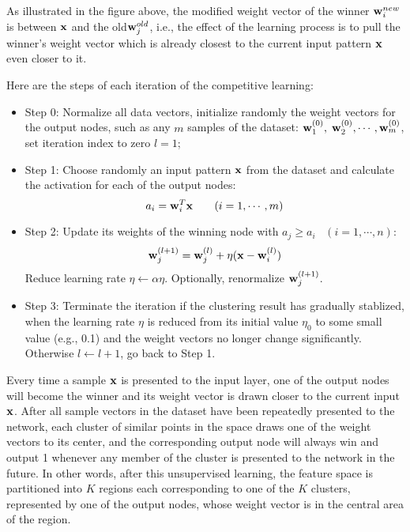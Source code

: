 \documentclass{article}
\begin{document}

As illustrated in the figure above, the modified weight vector of the
winner ${\bf w}_i^{new}$ is between ${\bf x}$ and the old${\bf w}_j^{old}$,
i.e., the effect of the learning process is to pull the winner's weight 
vector which is already closest to the current input pattern ${\bf x}$ 
even closer to it.

Here are the steps of each iteration of the competitive learning:
\begin{itemize}
\item Step 0: Normalize all data vectors, initialize randomly the weight
  vectors for the output nodes, such as any $m$ samples of the dataset:
  ${\bf w}_1^{(0)},\;{\bf w}_2^{(0)},\cdots,{\bf w}_m^{(0)}$, set iteration
  index to zero $l=1$;

\item Step 1: Choose randomly an input pattern ${\bf x}$ from the dataset 
  and calculate the activation for each of the output nodes:
  \begin{equation}
  a_i={\bf w}_i^T{\bf x}\;\;\;\;\;\;\;(i=1,\cdots,m)
  \end{equation}

\item Step 2: Update its weights of the winning node with
  $a_j\ge a_i\;\;\;(i=1,\cdots,n)$:
  \begin{equation}
  {\bf w}_j^{(l+1)}={\bf w}_j^{(l)} +\eta ({\bf x}-{\bf w}_i^{(l)})
  \end{equation}
  Reduce learning rate $\eta\leftarrow \alpha \eta$.
  Optionally, renormalize ${\bf w}_j^{(l+1)}$. 

\item Step 3: Terminate the iteration if the clustering result has
  gradually stablized, when the learning rate $\eta$ is reduced from
  its initial value $\eta_0$ to some small value (e.g., 0.1) and the 
  weight vectors no longer change significantly. Otherwise 
  $l \leftarrow l+1 $, go back to Step 1.
\end{itemize}

Every time a sample ${\bf x}$ is presented to the input layer, one of
the output nodes will become the winner and its weight vector is drawn 
closer to the current input ${\bf x}$. After all sample vectors in the
dataset have been repeatedly presented to the network, each cluster
of similar points in the space draws one of the weight vectors to its 
center, and the corresponding output node will always win and output 1
whenever any member of the cluster is presented to the network in the 
future. In other words, after this unsupervised learning, the feature
space is partitioned into $K$ regions each corresponding to one of the 
$K$ clusters, represented by one of the output nodes, whose weight vector
is in the central area of the region. 
\end{document}
